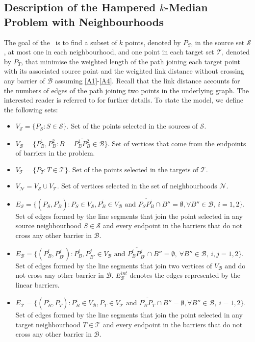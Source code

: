 \documentclass[a4paper,  review, authoryear, 1p.]{elsarticle}
\newcommand{\KMPHN}{{\sf{H-KMPHN}}}
\newcommand{\B}{{\mathcal B}}
\newcommand{\VB}{{V^{}_{\mathcal B}}}
\newcommand{\EB}{{E^{}_{\mathcal B}}}
\newcommand{\EBint}{{E^{int}_{\mathcal B}}}
\newcommand{\VS}{{V^{}_{\mathcal S}}}
\newcommand{\ES}{{E^{}_{\mathcal S}}}
\newcommand{\VT}{{V^{}_{\mathcal T}}}
\newcommand{\ET}{{E^{}_{\mathcal T}}}
\newcommand{\VN}{{V^{}_{\mathcal N}}}
\newcommand{\CV}[1]{{\color{blue}#1}}
\begin{document}
	\subsection{Description of the Hampered $k$-Median Problem with Neighbourhoods}\label{subsection:descriptionKMPN}
	
	The goal of the \KMPHN \ is to find a subset of $k$ points, \CV{denoted by \CV{$P_S$}}, in the source set $\mathcal S$, at most one in each neighbourhood, and one point in each target set $\mathcal T$, \CV{denoted by $P_T$}, that minimise the weighted length of the path joining each target point with its associated source point and the weighted link distance without crossing any barrier of $\mathcal B$ assuming \ref{A1}-\ref{A4}. Recall that the link distance accounts for the numbers of edges of the path joining two points in the underlying graph. The interested reader is referred to \citet{deberg1990,daescu2008} for further details. To state the model, we define the following sets:
	\begin{itemize}
		\item $\VS=\{P_S:S\in\mathcal S\}$. Set of the points selected in the sources of $\mathcal S$.
		\item $\VB=\{P^1_B, P^2_B:B=\overline{P^1_B P^2_B}\in \mathcal B\}$. Set of vertices that come from the endpoints of barriers in the problem.
		\item $\VT=\{P^{}_T:T\in\mathcal T\}$. Set of the points selected in the targets of $\mathcal T$.
		\item \CV{$\VN=\VS\cup\VT$. Set of vertices selected in the set of neighbourhoods $\mathcal N$.}
		\item $\ES=\{(P_S, P^i_{B}):P_S\in\VS, P^i_B\in V_\B\text{ and } \overline{P_SP^i_B}\cap B''=\emptyset,\forall B''\in\B,\:i=1,2\}$. Set of edges formed by the line segments that join the point selected in any source neighbourhood $S\in \mathcal{S}$ and every endpoint in the barriers that do not cross any other barrier in $\B$.
		\item $\EB=\{(P^{i}_B, P^{j}_{B'}):P^i_B, P^j_{B'}\in \VB \text{ and } \overline{P^i_B P^j_{B'}}\cap B''=\emptyset,\:\forall B''\in\mathcal B,\:i, j=1,2\}$. Set of edges formed by the line segments that join two vertices of $V_{\mathcal B}$ and do not cross any other barrier in $\B$. \CV{$\EBint$ denotes the edges represented by the linear barriers.}
		\item $\ET=\{(P^i_{B}, P^{}_T):P^i_B\in V_\B, P_T\in\VT\text{ and } \overline{P^i_BP^{}_T}\cap B''=\emptyset,\forall B''\in\B,\:i=1,2\}$. Set of edges formed by the line segments that join the point selected in any target neighbourhood $T\in \mathcal{T}$ and every endpoint in the barriers that do not cross any other barrier in $\B$.
	\end{itemize} 
	
\end{document}
